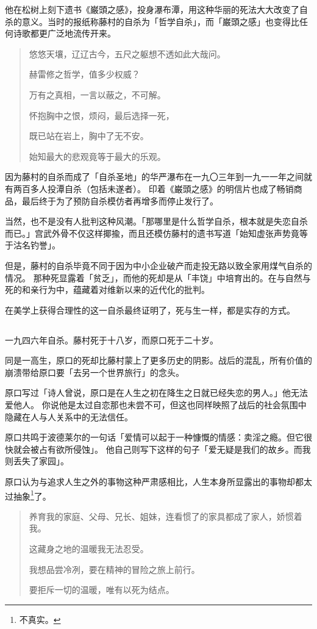 \documentclass[UTF8]{ctexart}
\begin{document}
他在松树上刻下遗书《巌頭之感》，投身瀑布潭，用这种华丽的死法大大改变了自杀的意义。当时的报纸称藤村的自杀为「哲学自杀」，而「巌頭之感」也变得比任何诗歌都更广泛地流传开来。

\begin{verse}
    悠悠天壤，辽辽古今，五尺之躯想不透如此大哉问。
    
    赫雷修之哲学，值多少权威？
    
    万有之真相，一言以蔽之，不可解。
    
    怀抱胸中之恨，烦闷，最后选择一死，
    
    既已站在岩上，胸中了无不安。
    
    始知最大的悲观竟等于最大的乐观。
\end{verse}

因为藤村的自杀而成了「自杀圣地」的华严瀑布在一九〇三年到一九一一年之间就有两百多人投潭自杀（包括未遂者）。
印着《巌頭之感》的明信片也成了畅销商品，最后终于为了预防自杀模仿者再增多而停止发行了。

当然，也不是没有人批判这种风潮。「那哪里是什么哲学自杀，根本就是失恋自杀而已。」宫武外骨不仅这样揶揄，而且还模仿藤村的遗书写道「始知虚张声势竟等于沽名钓誉」。

但是，藤村的自杀毕竟不同于因为中小企业破产而走投无路以致全家用煤气自杀的情况。
那种死显露着「贫乏」，而他的死却是从「丰饶」中培育出的。在与自然与死的和亲行为中，蕴藏着对维新以来的近代化的批判。

在美学上获得合理性的这一自杀最终证明了，死与生一样，都是实存的方式。

\subsection{}
一九四六年自杀。藤村死于十八岁，而原口死于二十岁。

同是一高生，原口的死却比藤村蒙上了更多历史的阴影。战后的混乱，所有价值的崩溃带给原口要「去另一个世界旅行」的念头。

原口写过「诗人曾说，原口是在人生之初在降生之日就已经失恋的男人。」他无法爱他人。
你说他是太过自恋那也未尝不可，但这也同样映照了战后的社会氛围中隐藏在人与人关系中的无法信任。

原口共鸣于波德莱尔的一句话「爱情可以起于一种慷慨的情感：卖淫之瘾。但它很快就会被占有欲所侵蚀」。
他自己则写下这样的句子「爱无疑是我们的故乡。而我则丢失了家园」。

原口认为与追求人生之外的事物这种严肃感相比，人生本身所显露出的事物却都太过抽象\footnote{不真实。}了。

\begin{verse}
    养育我的家庭、父母、兄长、姐妹，连看惯了的家具都成了家人，娇惯着我。

    这藏身之地的温暖我无法忍受。

    我想品尝冷冽，要在精神的冒险之旅上前行。

    要拒斥一切的温暖，唯有以死为结点。
\end{verse}
\end{document}
